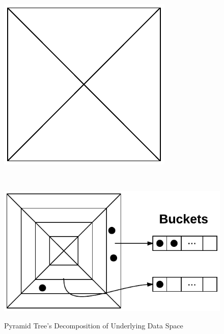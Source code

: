 \begin{figure}
		\begin{center}
			\begin{subfloat}{%
				\includegraphics[scale=0.7]{figures/pyramid_tree_partition.pdf}
			}
			\end{subfloat}~~~~
			\begin{subfloat} {%
				\includegraphics[scale=0.7]{figures/pyramid_tree_buckets.pdf}
			}
			\end{subfloat}
		\end{center}

		\caption{Pyramid Tree's Decomposition of Underlying Data Space}
		\label{fig:pyramid-tree-partition}
\end{figure}

